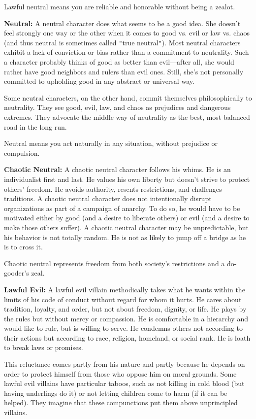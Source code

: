 Lawful neutral means you are reliable and honorable without being a zealot.
				
\textbf{Neutral:} A neutral character does what seems to be a good idea. She doesn't feel strongly one way or the other when it comes to good vs. evil or law vs. chaos (and thus neutral is sometimes called \texttt{{}"{}}true neutral\texttt{{}"{}}). Most neutral characters exhibit a lack of conviction or bias rather than a commitment to neutrality. Such a character probably thinks of good as better than evil---after all, she would rather have good neighbors and rulers than evil ones. Still, she's not personally committed to upholding good in any abstract or universal way.
				
Some neutral characters, on the other hand, commit themselves philosophically to neutrality. They see good, evil, law, and chaos as prejudices and dangerous extremes. They advocate the middle way of neutrality as the best, most balanced road in the long run.
				
Neutral means you act naturally in any situation, without prejudice or compulsion.
				
\textbf{Chaotic Neutral:} A chaotic neutral character follows his whims. He is an individualist first and last. He values his own liberty but doesn't strive to protect others' freedom. He avoids authority, resents restrictions, and challenges traditions. A chaotic neutral character does not intentionally disrupt organizations as part of a campaign of anarchy. To do so, he would have to be motivated either by good (and a desire to liberate others) or evil (and a desire to make those others suffer). A chaotic neutral character may be unpredictable, but his behavior is not totally random. He is not as likely to jump off a bridge as he is to cross it.
				
Chaotic neutral represents freedom from both society's restrictions and a do-gooder's zeal.
				
\textbf{Lawful Evil:} A lawful evil villain methodically takes what he wants within the limits of his code of conduct without regard for whom it hurts. He cares about tradition, loyalty, and order, but not about freedom, dignity, or life. He plays by the rules but without mercy or compassion. He is comfortable in a hierarchy and would like to rule, but is willing to serve. He condemns others not according to their actions but according to race, religion, homeland, or social rank. He is loath to break laws or promises.
				
This reluctance comes partly from his nature and partly because he depends on order to protect himself from those who oppose him on moral grounds. Some lawful evil villains have particular taboos, such as not killing in cold blood (but having underlings do it) or not letting children come to harm (if it can be helped). They imagine that these compunctions put them above unprincipled villains.
				
